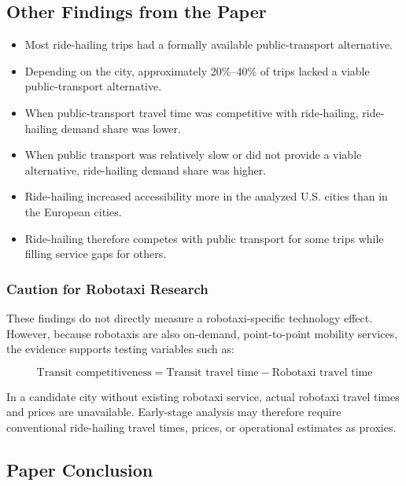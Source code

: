 \documentclass[10pt,a4paper]{article}
\providecommand{\tightlist}{\setlength{\itemsep}{0pt}\setlength{\parskip}{0pt}}
\begin{document}
\hypertarget{other-findings-from-the-paper-3}{%
\subsection{Other Findings from the Paper}\label{other-findings-from-the-paper-3}}

\begin{itemize}
\tightlist
\item
  Most ride-hailing trips had a formally available public-transport alternative.
\item
  Depending on the city, approximately 20\%--40\% of trips lacked a viable public-transport alternative.
\item
  When public-transport travel time was competitive with ride-hailing, ride-hailing demand share was lower.
\item
  When public transport was relatively slow or did not provide a viable alternative, ride-hailing demand share was higher.
\item
  Ride-hailing increased accessibility more in the analyzed U.S. cities than in the European cities.
\item
  Ride-hailing therefore competes with public transport for some trips while filling service gaps for others.
\end{itemize}

\hypertarget{caution-for-robotaxi-research-1}{%
\subsubsection{Caution for Robotaxi Research}\label{caution-for-robotaxi-research-1}}

These findings do not directly measure a robotaxi-specific technology effect. However, because robotaxis are also on-demand, point-to-point mobility services, the evidence supports testing variables such as:

\[
\text{Transit competitiveness}
=
\text{Transit travel time}
-
\text{Robotaxi travel time}
\]

In a candidate city without existing robotaxi service, actual robotaxi travel times and prices are unavailable. Early-stage analysis may therefore require conventional ride-hailing travel times, prices, or operational estimates as proxies.

\hypertarget{paper-conclusion-3}{%
\subsection{Paper Conclusion}\label{paper-conclusion-3}}
\end{document}
